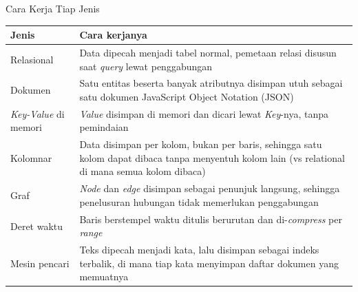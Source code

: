 \documentclass[aspectratio=169, table, 12pt]{beamer}
\begin{document}
\begin{frame}{{\Large Cara Kerja Tiap Jenis}}
  \vspace{5pt}
  \centering
  {\footnotesize
  \begin{tabularx}{\textwidth}{lX}
    \hline
    \textbf{Jenis} & \textbf{Cara kerjanya} \\
    \hline
    Relasional & Data dipecah menjadi tabel normal, pemetaan relasi disusun saat \textit{query} lewat penggabungan \\
    \hline
    Dokumen & Satu entitas beserta banyak atributnya disimpan utuh sebagai satu dokumen JavaScript Object Notation (JSON) \\
    \hline
    \textit{Key-Value} di memori & \textit{Value} disimpan di memori dan dicari lewat \textit{Key}-nya, tanpa pemindaian \\
    \hline
    Kolomnar & Data disimpan per kolom, bukan per baris, sehingga satu kolom dapat dibaca tanpa menyentuh kolom lain (vs relational di mana semua kolom dibaca)  \\
    \hline
    Graf & \textit{Node} dan \textit{edge} disimpan sebagai penunjuk langsung, sehingga penelusuran hubungan tidak memerlukan penggabungan \\
    \hline
    Deret waktu & Baris berstempel waktu ditulis berurutan dan di-\textit{compress} per \textit{range} \\
    \hline
    Mesin pencari & Teks dipecah menjadi kata, lalu disimpan sebagai indeks terbalik, di mana tiap kata menyimpan daftar dokumen yang memuatnya \\
    \hline
  \end{tabularx}}
\end{frame}
\end{document}

